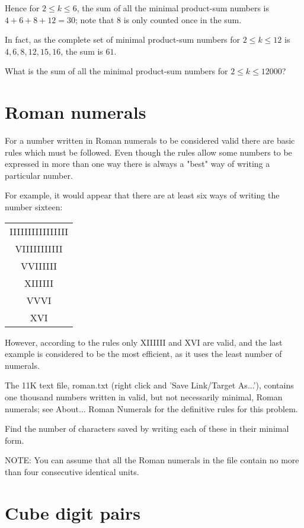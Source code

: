 Hence for $2 \leqslant k \leqslant 6$, the sum of all the minimal product-sum numbers is $4+6+8+12 = 30$; note that $8$ is only counted once in the sum.

In fact, as the complete set of minimal product-sum numbers for $2 \leqslant k \leqslant 12$ is ${4, 6, 8, 12, 15, 16}$, the sum is $61$.

What is the sum of all the minimal product-sum numbers for $2 \leqslant k \leqslant 12000$?

\section{Roman numerals} \label{pb.089}

For a number written in Roman numerals to be considered valid there are basic rules which must be followed. Even though the rules allow some numbers to be expressed in more than one way there is always a "best" way of writing a particular number.

For example, it would appear that there are at least six ways of writing the number sixteen:

\begin{center}
    \begin{tabular}{c}
        IIIIIIIIIIIIIIII\\
        VIIIIIIIIIII\\
        VVIIIIII\\
        XIIIIII\\
        VVVI\\
        XVI\\
    \end{tabular}
\end{center}

However, according to the rules only XIIIIII and XVI are valid, and the last example is considered to be the most efficient, as it uses the least number of numerals.

The 11K text file, roman.txt (right click and 'Save Link/Target As...'), contains one thousand numbers written in valid, but not necessarily minimal, Roman numerals; see About... Roman Numerals for the definitive rules for this problem.

Find the number of characters saved by writing each of these in their minimal form.

NOTE: You can assume that all the Roman numerals in the file contain no more than four consecutive identical units.

\section{Cube digit pairs} \label{pb.090}

